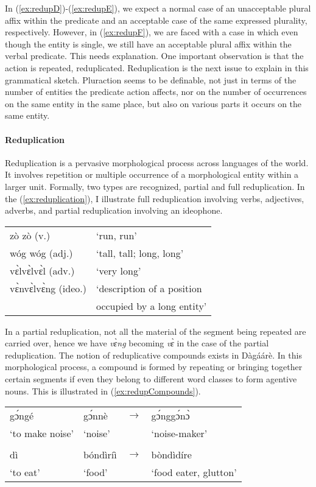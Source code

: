 \begin{refsection}
In (\ref{ex:redupD})-(\ref{ex:redupE}), we expect a normal case of an unacceptable plural affix within the predicate and
an acceptable case of the same expressed plurality, respectively. However, in (\ref{ex:redupF}), we are
faced with a case in which even though the entity is single, we still have an acceptable plural
affix within the verbal predicate. This needs explanation. One important observation is that
the action is repeated, reduplicated. Reduplication is the next issue to explain in this
grammatical sketch. Pluraction seems to be definable, not just in terms of the number of
entities the predicate action affects, nor on the number of occurrences on the same entity in
the same place, but also on various parts it occurs on the same entity.

\paragraph{Reduplication}
Reduplication is a pervasive morphological process across languages of the world. It
involves repetition or multiple occurrence of a morphological entity within a larger unit.
Formally, two types are recognized, partial and full reduplication. In the (\ref{ex:reduplication}), I illustrate full reduplication involving verbs, adjectives, adverbs, and partial
reduplication involving an ideophone.

\ea \label{ex:reduplication} \begin{tabular}{ll}   zò zò (v.)& ‘run, run’\\
 wóg wóg (adj.)& ‘tall, tall; long, long’\\
 vɛ̀lvɛ̀lvɛ̀l (adv.)& ‘very long’\\
 vɛ̀nvɛ̀lvɛ̀ng (ideo.) & ‘description of a position \\
 &occupied by a long entity’\\
 \end{tabular}\z

In a partial reduplication, not all the material of the segment being repeated are carried over,
hence we have \textit{vɛ̀ng} becoming \textit{vɛ̀} in the case of the partial reduplication.
The notion of reduplicative compounds exists in Dàgáárè. In this morphological process, a
compound is formed by repeating or bringing together certain segments if even they belong to
different word classes to form agentive nouns. This is illustrated in (\ref{ex:redupCompounds}).


\ea \label{ex:redupCompounds} \begin{tabular}{llll} 
 gɔ́ngé& gɔ́nnè& $\rightarrow$ &gɔ́nggɔ́nɔ̀\\
‘to make noise’& ‘noise’&& ‘noise-maker’\\
&&&\\
dì & bóndìríì& $\rightarrow$ &bòndìdíre\\
‘to eat’& ‘food’&& ‘food eater, glutton’\\
\end{tabular}
\z 



\end{refsection}
